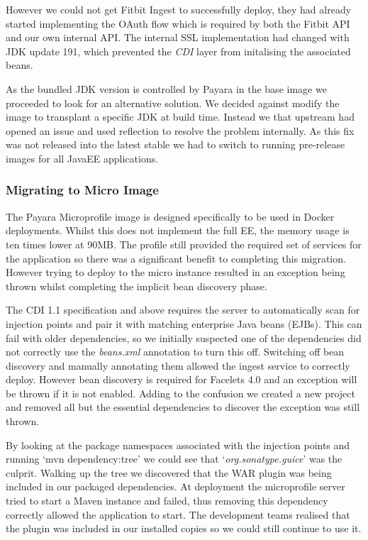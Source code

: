         \par
        However we could not get Fitbit Ingest to successfully deploy, they had already started implementing the OAuth flow which is required by both the Fitbit API and our own internal API. The internal SSL implementation had changed with JDK update 191, which prevented the \textit{CDI} layer from initalising the associated beans.

        \par
        As the bundled JDK version is controlled by Payara in the base image we proceeded to look for an alternative solution. We decided against modify the image to transplant a specific JDK at build time. Instead we that upstream had opened an issue \cite{payara_ssl_issue} and used reflection to resolve the problem internally. As this fix was not released into the latest stable we had to switch to running pre-release images for all JavaEE applications.

        \subsubsection{Migrating to Micro Image}
        \par
        The Payara Microprofile image is designed specifically to be used in Docker deployments. Whilst this does not implement the full EE, the memory usage is ten times lower at 90MB. The profile still provided the required set of services for the application so there was a significant benefit to completing this migration. However trying to deploy to the micro instance resulted in an exception being thrown whilst completing the implicit bean discovery phase. 

        \par
        The CDI 1.1 specification and above requires the server to automatically scan for injection points and pair it with matching enterprise Java beans (EJBs). This can fail with older dependencies, so we initially suspected one of the dependencies did not correctly use the \textit{beans.xml} annotation to turn this off.
        \newline
        Switching off bean discovery and manually annotating them allowed the ingest service to correctly deploy. However bean discovery is required for Facelets 4.0 and an exception will be thrown if it is not enabled. Adding to the confusion we created a new project and removed all but the essential dependencies to discover the exception was still thrown.
        
        \par
        By looking at the package namespaces associated with the injection points and running `mvn dependency:tree' we could see that `\textit{org.sonatype.guice}' was the culprit. Walking up the tree we discovered that the WAR plugin was being included in our packaged dependencies. At deployment the microprofile server tried to start a Maven instance and failed, thus removing this dependency correctly allowed the application to start. The development teams realised that the plugin was included in our installed copies so we could still continue to use it.

